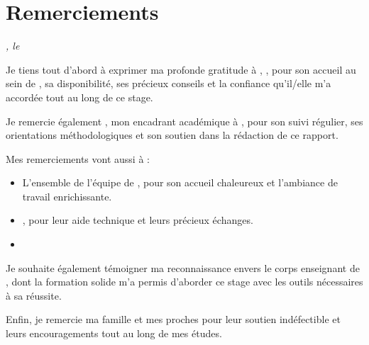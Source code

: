 \chapter*{Remerciements}

\begin{flushright}
  \textit{, le }
\end{flushright}

\vspace{1em}

Je tiens tout d'abord à exprimer ma profonde gratitude à
\textbf{\SupervisorPro}, , pour son accueil
au sein de \textbf{\CompanyName}, sa disponibilité, ses précieux
conseils et la confiance qu'il/elle m'a accordée tout au long de
ce stage.

\vspace{0.8em}

Je remercie également \textbf{\SupervisorAca}, mon encadrant
académique à \textbf{\SchoolName}, pour son suivi régulier,
ses orientations méthodologiques et son soutien dans la
rédaction de ce rapport.

\vspace{0.8em}

Mes remerciements vont aussi à :
\begin{itemize}
  \item L'ensemble de l'équipe de ,
        pour son accueil chaleureux et l'ambiance de travail
        enrichissante.
  \item {},
        pour leur aide technique et leurs précieux échanges.
  \item {}
\end{itemize}

\vspace{0.8em}

Je souhaite également témoigner ma reconnaissance envers le
corps enseignant de \textbf{\SchoolName}, dont la formation
solide m'a permis d'aborder ce stage avec les outils nécessaires
à sa réussite.

\vspace{0.8em}

Enfin, je remercie ma famille et mes proches pour leur soutien
indéfectible et leurs encouragements tout au long de mes études.

\vspace{2em}

\begin{flushright}
  \textit{\StudentName}
\end{flushright}

\clearpage
